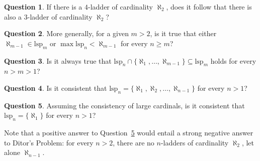 \documentclass[]{amsart}
\theoremstyle{definition}
\newtheorem{question}{Question}
\theoremstyle{remark}
\begin{document}
\begin{question}
If there is a $4$-ladder of cardinality $\aleph_2$, does it follow that there is also a $3$-ladder of cardinality $\aleph_2$?
\end{question}
\begin{question}
More generally, for a given $m > 2$, is it true that either $\aleph_{m-1} \in \mathrm{lsp}_m$ or $\max \mathrm{lsp}_n < \aleph_{m-1}$ for every $n \ge m$?
\end{question}
\begin{question}
Is it always true that $\mathrm{lsp}_{n} \cap \{\aleph_1, \dots, \aleph_{m-1}\} \subseteq \mathrm{lsp}_m$ holds for every $n > m > 1$?
\end{question}
\begin{question}
Is it consistent that $\mathrm{lsp}_n = \{\aleph_1, \aleph_2, \dots, \aleph_{n-1}\}$ for every $n > 1$?
\end{question}
\begin{question}\label{q:9}
Assuming the consistency of large cardinals, is it consistent that $\mathrm{lsp}_n = \{\aleph_1\}$ for every $n > 1$?
\end{question}

Note that a positive answer to Question~\ref{q:9} would entail a strong negative answer to Ditor's Problem: for every $n > 2$, there are no $n$-ladders of cardinality $\aleph_2$, let alone $\aleph_{n-1}$.

\printbibliography
\end{document}
